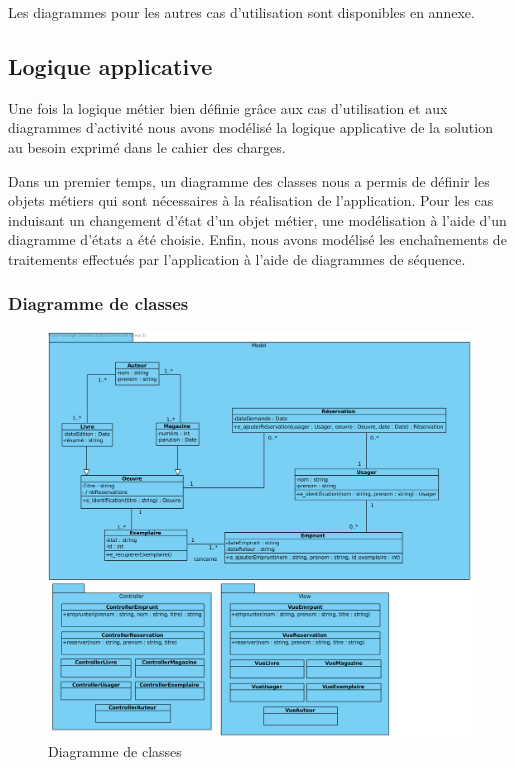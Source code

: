\documentclass[a4paper,12pt]{article}
\begin{document}
Les diagrammes pour les autres cas d’utilisation sont disponibles en annexe.

\subsection{Logique applicative}
\label{sec:orgheadline12}

Une fois la logique métier bien définie grâce aux cas d’utilisation et aux
diagrammes d’activité nous avons modélisé la logique applicative de la
solution au besoin exprimé dans le cahier des charges.

Dans un premier temps, un diagramme des classes nous a permis de définir les
objets métiers qui sont nécessaires à la réalisation de l’application. Pour les
cas induisant un changement d’état d’un objet métier, une modélisation à l’aide
d’un diagramme d’états a été choisie. Enfin, nous avons modélisé les
enchaînements de traitements effectués par l’application à l’aide de diagrammes
de séquence.

\clearpage

\subsubsection{Diagramme de classes}
\label{sec:orgheadline7}

\begin{figure}[htb]
\centering
\includegraphics[width=.9\linewidth]{./res/img/diagramme-des-classes.png}
\caption{\label{fig:orgparagraph3}
Diagramme de classes}
\end{figure}
\end{document}
